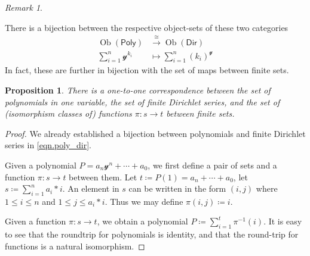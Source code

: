 \documentclass[11pt, article, one side]{memoir}
\theoremstyle{theorem}
\newtheorem{proposition}[equation]{Proposition}
\theoremstyle{definition}
\theoremstyle{remark}
\newtheorem{remark}[equation]{Remark}
\DeclareMathOperator{\ob}{Ob}
\newcommand{\Cat}[1]{\mathsf{#1}}%
\newcommand{\To}[1]{\xrightarrow{#1}}
\newcommand{\inv}{^{-1}}
\newcommand{\yon}{\mathcal{y}}
\newcommand{\poly}{\Cat{Poly}}
\newcommand{\dir}{\Cat{Dir}}
\begin{document}
\begin{remark}

\end{remark}

There is a bijection between the respective object-sets of these two categories
\begin{align}
\nonumber
	\ob(\poly)&\To{\cong}\ob(\dir)\\\label{eqn.poly_dir}
	\sum_{i=1}^n\yon^{k_i}&\mapsto\sum_{i=1}^n (k_i)^\yon
\end{align}
In fact, these are further in bijection with the set of maps between finite sets.
\begin{proposition}\label{prop.poly_function}
There is a one-to-one correspondence between the set of polynomials in one variable, the set of finite Dirichlet series, and the set of (isomorphism classes of) functions $\pi\colon s\to t$ between finite sets.
\end{proposition}
\begin{proof}
We already established a bijection between polynomials and finite Dirichlet series in \cref{eqn.poly_dir}.

Given a polynomial $P=a_n\yon^n+\cdots+a_0$, we first define a pair of sets and a function $\pi\colon s\to t$ between them. Let $t\coloneqq P(1)=a_n+\cdots+a_0$, let $s\coloneqq\sum_{i=1}^na_i*i$. An element in $s$ can be written in the form $(i,j)$ where $1\leq i\leq n$ and $1\leq j\leq a_i*i$. Thus we may define $\pi(i,j)\coloneqq i$.

Given a function $\pi\colon s\to t$, we obtain a polynomial $P\coloneqq\sum_{i=1}^{t}\pi\inv(i)$. It is easy to see that the roundtrip for polynomials is identity, and that the round-trip for functions is a natural isomorphism.
\end{proof}
\end{document}
